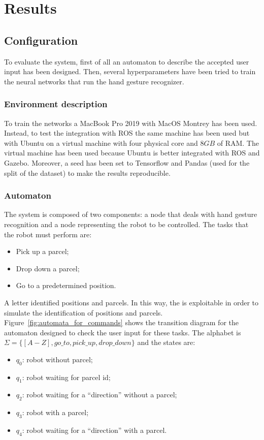 \documentclass[../thesis.tex]{subfiles}
\begin{document}
\chapter{Results}\label{cap:results}
\section{Configuration}
To evaluate the system, first of all an automaton to describe the accepted user input has been designed. Then, several hyperparameters have been tried to train the neural networks that run the hand gesture recognizer.

\subsection{Environment description}
To train the networks a MacBook Pro 2019 with MacOS Montrey has been used. Instead, to test the integration with ROS the same machine has been used but with Ubuntu on a virtual machine with four physical core and $8GB$ of RAM. The virtual machine has been used because Ubuntu is better integrated with \acrshort{ROS} and Gazebo. Moreover, a seed has been set to Tensorflow and Pandas (used for the split of the dataset) to make the results reproducible.

\subsection{Automaton}\label{ss:automaton_description}
The system is composed of two components: a node that deals with  hand gesture recognition and a node representing the robot to be controlled. The tasks that the robot must perform are:
\begin{itemize}
    \item Pick up a parcel;
    \item Drop down a parcel;
    \item Go to a predetermined position.
\end{itemize}
A letter identified positions and parcels. In this way, the  is exploitable in order to simulate the identification of positions and parcels.\\
Figure~\ref{fig:automata_for_commands} shows the transition diagram for the automaton designed to check the user input for these tasks. The alphabet is $\Sigma = \{[A-Z], go\_to, pick\_up, drop\_down\}$ and the states are:
\begin{itemize}
    \item \textbf{$q_0$}: robot without parcel; 
    \item \textbf{$q_1$}: robot waiting for parcel id; 
    \item \textbf{$q_2$}: robot waiting for a ``direction'' without a parcel;
    \item \textbf{$q_3$}: robot with a parcel;
    \item \textbf{$q_4$}: robot waiting for a ``direction'' with a parcel.
\end{itemize}
\end{document}
